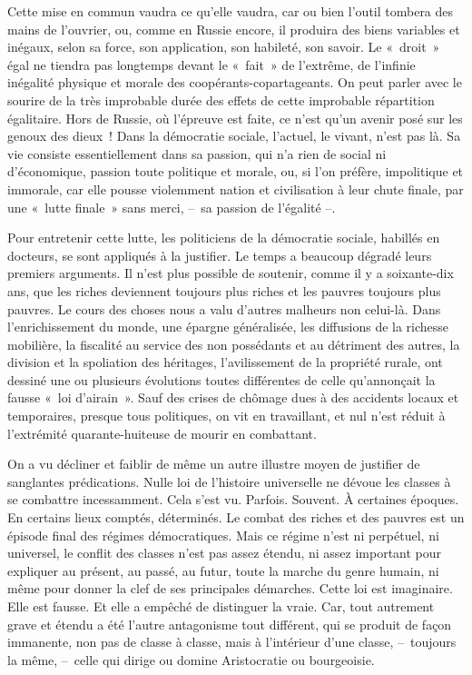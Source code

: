 \documentclass[french,twoside]{book} %
\begin{document}
Cette mise en commun vaudra ce qu’elle vaudra, car ou bien l’outil tombera des mains de l’ouvrier, ou, comme en Russie encore, il produira des biens variables et inégaux, selon sa force, son application, son habileté, son savoir. Le « droit » égal ne tiendra pas longtemps devant le « fait » de l’extrême, de l’infinie inégalité physique et morale des coopérants-copartageants. On peut parler avec le sourire de la très improbable durée des effets de cette improbable répartition égalitaire. Hors de Russie, où l’épreuve est faite, ce n’est qu’un avenir posé sur les genoux des dieux ! Dans la démocratie sociale, l’actuel, le vivant, n’est pas là. Sa vie consiste essentiellement dans sa passion, qui n’a rien de social ni d’économique, passion toute politique et morale, ou, si l’on préfère, impolitique et immorale, car elle pousse violemment nation et civilisation à leur chute finale, par une « lutte finale » sans merci, – sa passion de l’égalité –.\par
Pour entretenir cette lutte, les politiciens de la démocratie sociale, habillés en docteurs, se sont appliqués à la justifier. Le temps a beaucoup dégradé leurs premiers arguments. Il n’est plus possible de soutenir, comme il y a soixante-dix ans, que les riches deviennent toujours plus riches et les pauvres toujours plus pauvres. Le cours des choses nous a valu d’autres malheurs non celui-là. Dans l’enrichissement du monde, une épargne généralisée, les diffusions de la richesse mobilière, la fiscalité au service des non possédants et au détriment des autres, la division et la spoliation des héritages, l’avilissement de la propriété rurale, ont dessiné une ou plusieurs évolutions toutes différentes de celle qu’annonçait la fausse « loi d’airain ». Sauf des crises de chômage dues à des accidents locaux et temporaires, presque tous politiques, on vit en travaillant, et nul n’est réduit à l’extrémité quarante-huiteuse de mourir en combattant.\par
On a vu décliner et faiblir de même un autre illustre moyen de justifier de sanglantes prédications. Nulle loi de l’histoire universelle ne dévoue les classes à se combattre incessamment. Cela s’est vu. Parfois. Souvent. À certaines époques. En certains lieux comptés, déterminés. Le combat des riches et des pauvres est un épisode final des régimes démocratiques. Mais ce régime n’est ni perpétuel, ni universel, le conflit des classes n’est pas assez étendu, ni assez important pour expliquer au présent, au passé, au futur, toute la marche du genre humain, ni même pour donner la clef de ses principales démarches. Cette loi est imaginaire. Elle est fausse. Et elle a empêché de distinguer la vraie. Car, tout autrement grave et étendu a été l’autre antagonisme tout différent, qui se produit de façon immanente, non pas de classe à classe, mais à l’intérieur d’une classe, – toujours la même, – celle qui dirige ou domine Aristocratie ou bourgeoisie.\par
\end{document}
